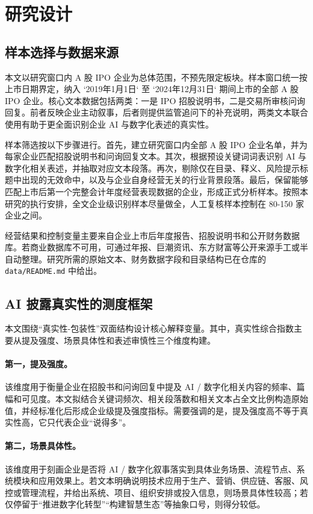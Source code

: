 \section{研究设计}

\subsection{样本选择与数据来源}

本文以研究窗口内 A 股 IPO 企业为总体范围，不预先限定板块。样本窗口统一按上市日期界定，纳入 `2019年1月1日` 至 `2024年12月31日` 期间上市的全部 A 股 IPO 企业。核心文本数据包括两类：一是 IPO 招股说明书，二是交易所审核问询回复。前者反映企业主动叙事，后者则提供监管追问下的补充说明，两类文本联合使用有助于更全面识别企业 AI 与数字化表述的真实性。

样本筛选按以下步骤进行。首先，建立研究窗口内全部 A 股 IPO 企业名单，并为每家企业匹配招股说明书和问询回复文本。其次，根据预设关键词词表识别 AI 与数字化相关表述，并抽取对应文本段落。再次，剔除仅在目录、释义、风险提示标题中出现的无效命中，以及与企业自身经营无关的行业背景段落。最后，保留能够匹配上市后第一个完整会计年度经营表现数据的企业，形成正式分析样本。按照本研究的执行安排，全文企业级识别样本尽量做全，人工复核样本控制在 80-150 家企业之间。

经营结果和控制变量主要来自企业上市后年度报告、招股说明书和公开财务数据库。若商业数据库不可用，可通过年报、巨潮资讯、东方财富等公开来源手工或半自动整理。研究所需的原始文本、财务数据字段和目录结构已在仓库的 \texttt{data/README.md} 中给出。

\subsection{AI 披露真实性的测度框架}

本文围绕“真实性-包装性”双面结构设计核心解释变量。其中，真实性综合指数主要从提及强度、场景具体性和表述审慎性三个维度构建。

\paragraph{第一，提及强度。} 该维度用于衡量企业在招股书和问询回复中提及 AI / 数字化相关内容的频率、篇幅和可见度。本文拟结合关键词频次、相关段落数和相关文本占全文比例构造原始值，并经标准化后形成企业级提及强度指标。需要强调的是，提及强度高不等于真实性高，它只代表企业“说得多”。

\paragraph{第二，场景具体性。} 该维度用于刻画企业是否将 AI / 数字化叙事落实到具体业务场景、流程节点、系统模块和应用效果上。若文本明确说明技术应用于生产、营销、供应链、客服、风控或管理流程，并给出系统、项目、组织安排或投入信息，则场景具体性较高；若仅停留于“推进数字化转型”“构建智慧生态”等抽象口号，则得分较低。

